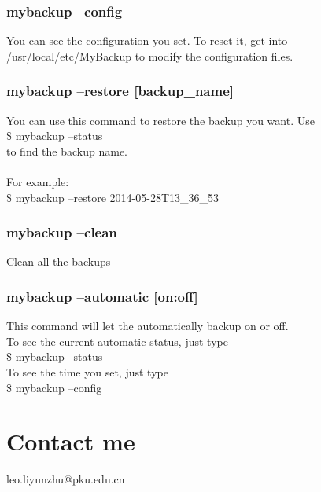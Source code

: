 \documentclass[a4paper]{article}
\begin{document}
                        \subsubsection{mybackup --config}

                        You can see the configuration you set. To reset it, get into /usr/local/etc/MyBackup to modify the configuration files.

                        \subsubsection{mybackup --restore [backup\_name]}

                        You can use this command to restore the backup you want. Use\\
                            \$ mybackup --status\\
                            to find the backup name. \\\\
                            For example:\\
                            \$ mybackup --restore 2014-05-28T13\_36\_53

                            \subsubsection{mybackup --clean}

                            Clean all the backups

                            \subsubsection{mybackup --automatic [on:off]}

                            This command will let the automatically backup on or off.\\
                                To see the current automatic status, just type\\
                                \$ mybackup --status\\
                                To see the time you set, just type\\
                                \$ mybackup --config

                                \section{Contact me}
                                leo.liyunzhu@pku.edu.cn

                                
\end{document}
